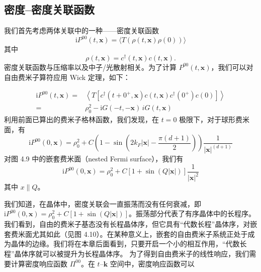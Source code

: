 \subsection{密度--密度关联函数}

我们首先考虑两体关联中的一种——密度关联函数
\begin{equation*}
\mathrm{i}P^{00}(t,\pmb{x}) = \langle T(\rho(t,\pmb{x})\rho(0))\rangle
\end{equation*}
其中
\begin{equation*}
\rho(t,\pmb{x}) = c^{\dagger}(t,\pmb{x})c(t,\pmb{x}).
\end{equation*}
密度关联函数与压缩率以及中子/光散射相关。为了计算 $P^{00}(t,\pmb{x})$，我们可以对自由费米子算符应用 Wick 定理，如下：


\begin{align*}
\mathrm{i}P^{00}(t,\pmb{x}) ={}& \left\langle T[c^{\dagger}(t + 0^{+},\pmb{x})c(t,\pmb{x})c^{\dagger}(0^{+})c(0)]\right\rangle\\
={}& \rho_{0}^{2} - \mathrm{i}G(-t,-\pmb{x})\,iG(t,\pmb{x})
\end{align*}
利用前面已算出的费米子格林函数，我们发现，在 $t = 0$ 极限下，对于球形费米面，有
\begin{equation*}
\mathrm{i}P^{00}(0,\pmb{x}) = \rho_{0}^{2} + C\left(1 - \sin\left(2k_{F}|\pmb{x}| - \frac{\pi(d+1)}{2}\right)\right)\frac{1}{|\pmb{x}|^{(d+1)}}
\end{equation*}
对图 4.9 中的嵌套费米面（nested Fermi surface），我们有
\begin{equation*}
\mathrm{i}P^{00}(0,\pmb{x}) = \rho_{0}^{2} + C[1 + \sin(Q|\pmb{x}|)]\frac{1}{|\pmb{x}|^{2}}
\end{equation*}
其中 $x \| Q$。

我们知道，在晶体中，密度关联会一直振荡而没有任何衰减，即 $\mathrm{i}P^{00}(0,\pmb{x}) = \rho_{0}^{2} + C[1 + \sin(Q|\pmb{x}|)]$。振荡部分代表了有序晶体中的长程序。我们看到，自由的费米子基态没有长程晶体序，但它具有“代数长程”晶体序，对嵌套费米面尤其如此（见图 4.10）。在某种意义上，嵌套的自由费米子系统正处于成为晶体的边缘。我们将在本章后面看到，只要开启一个小的相互作用，“代数长程”晶体序就可以被提升为长程晶体序。
为了得到自由费米子的线性响应，我们需要计算密度响应函数 $\Pi^{00}$。在 $t$--$\pmb{k}$ 空间中，密度响应函数可以
